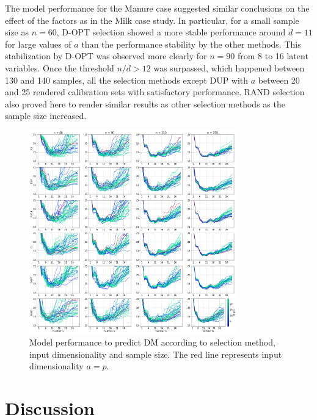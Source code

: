 \documentclass[journal=ancham,manuscript=article]{achemso}
\begin{document}
The model performance for the Manure case suggested similar conclusions on the effect of the factors as in the Milk case study. In particular, for a small sample size as $n=60$, D-OPT selection showed a more stable performance around $d = 11$ for large values of $a$ than the performance stability by the other methods. This stabilization by D-OPT was observed more clearly for $n=90$ from 8 to 16 latent variables. Once the threshold $n/d>12$ was surpassed, which happened between 130 and 140 samples, all the selection methods except DUP with $a$ between 20 and 25 rendered calibration sets with satisfactory performance. RAND selection also proved here to render similar results as other selection methods as the sample size increased. 




\begin{figure}[b]
\includegraphics[width=0.8\textwidth]{manuscript/figures/d02_manure_model_performance.png}
\centering
\caption{Model performance to predict DM according to selection method, input dimensionality and sample size. The red line represents input dimensionality $a=p$.}
\label{fig_d02_manure_model_performance}
\end{figure}




\section*{Discussion}\label{discussion}
\end{document}
